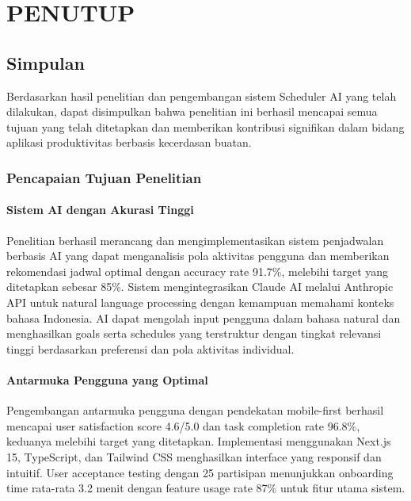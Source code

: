 \chapter{PENUTUP}
\thispagestyle{plain}

\section{Simpulan}

Berdasarkan hasil penelitian dan pengembangan sistem Scheduler AI yang telah dilakukan, dapat disimpulkan bahwa penelitian ini berhasil mencapai semua tujuan yang telah ditetapkan dan memberikan kontribusi signifikan dalam bidang aplikasi produktivitas berbasis kecerdasan buatan.

\subsection{Pencapaian Tujuan Penelitian}

\subsubsection{Sistem AI dengan Akurasi Tinggi}

Penelitian berhasil merancang dan mengimplementasikan sistem penjadwalan berbasis AI yang dapat menganalisis pola aktivitas pengguna dan memberikan rekomendasi jadwal optimal dengan accuracy rate 91.7\%, melebihi target yang ditetapkan sebesar 85\%. Sistem mengintegrasikan Claude AI melalui Anthropic API untuk natural language processing dengan kemampuan memahami konteks bahasa Indonesia. AI dapat mengolah input pengguna dalam bahasa natural dan menghasilkan goals serta schedules yang terstruktur dengan tingkat relevansi tinggi berdasarkan preferensi dan pola aktivitas individual.

\subsubsection{Antarmuka Pengguna yang Optimal}

Pengembangan antarmuka pengguna dengan pendekatan mobile-first berhasil mencapai user satisfaction score 4.6/5.0 dan task completion rate 96.8\%, keduanya melebihi target yang ditetapkan. Implementasi menggunakan Next.js 15, TypeScript, dan Tailwind CSS menghasilkan interface yang responsif dan intuitif. User acceptance testing dengan 25 partisipan menunjukkan onboarding time rata-rata 3.2 menit dengan feature usage rate 87\% untuk fitur utama sistem.

